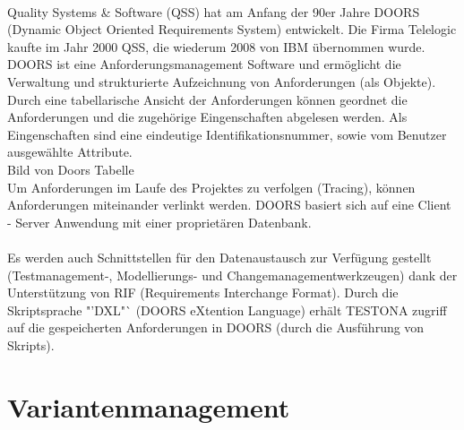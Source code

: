 \paragraph{}


Quality Systems \& Software (QSS) hat am Anfang der 90er Jahre DOORS (Dynamic Object Oriented Requirements System) entwickelt. Die Firma Telelogic kaufte im Jahr 2000 QSS, die wiederum 2008 von IBM übernommen wurde. DOORS ist eine Anforderungsmanagement Software und ermöglicht die Verwaltung und strukturierte Aufzeichnung von Anforderungen (als Objekte). Durch eine tabellarische Ansicht der Anforderungen können geordnet die Anforderungen und die zugehörige Eingenschaften abgelesen werden. Als Eingenschaften sind eine eindeutige Identifikationsnummer, sowie vom Benutzer ausgewählte Attribute.\\

Bild von Doors Tabelle
\\

Um Anforderungen im Laufe des Projektes zu verfolgen (Tracing), können Anforderungen miteinander verlinkt werden. DOORS basiert sich auf eine Client - Server Anwendung mit einer proprietären Datenbank. \\
\\
Es werden auch Schnittstellen für den Datenaustausch zur Verfügung gestellt (Testmanagement-, Modellierungs- und Changemanagementwerkzeugen) dank der Unterstützung von RIF (Requirements Interchange Format). Durch die Skriptsprache "'DXL"` (DOORS eXtention Language) erhält TESTONA zugriff auf die gespeicherten Anforderungen in DOORS (durch die Ausführung von Skripts). \cite{Doors} \cite{Anforderungsmanagement}\\

\section{Variantenmanagement}\label{sec:VarManag}
\paragraph{}


